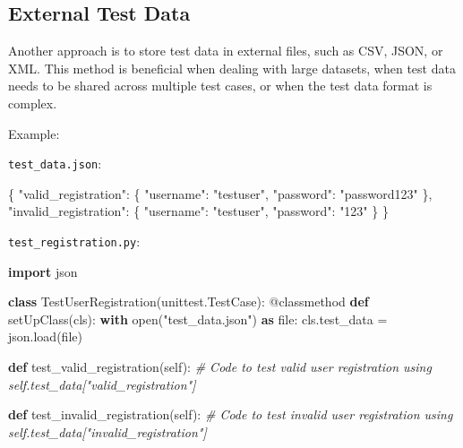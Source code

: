 \documentclass[
  paper=a4,
  ,captions=tableheading
]{scrartcl}
\newenvironment{Shaded}{}{}
\newcommand{\AttributeTok}[1]{\textcolor[rgb]{0.49,0.56,0.16}{#1}}
\newcommand{\BuiltInTok}[1]{\textcolor[rgb]{0.00,0.50,0.00}{#1}}
\newcommand{\CommentTok}[1]{\textcolor[rgb]{0.38,0.63,0.69}{\textit{#1}}}
\newcommand{\ControlFlowTok}[1]{\textcolor[rgb]{0.00,0.44,0.13}{\textbf{#1}}}
\newcommand{\DataTypeTok}[1]{\textcolor[rgb]{0.56,0.13,0.00}{#1}}
\newcommand{\FunctionTok}[1]{\textcolor[rgb]{0.02,0.16,0.49}{#1}}
\newcommand{\ImportTok}[1]{\textcolor[rgb]{0.00,0.50,0.00}{\textbf{#1}}}
\newcommand{\KeywordTok}[1]{\textcolor[rgb]{0.00,0.44,0.13}{\textbf{#1}}}
\newcommand{\NormalTok}[1]{#1}
\newcommand{\OperatorTok}[1]{\textcolor[rgb]{0.40,0.40,0.40}{#1}}
\newcommand{\StringTok}[1]{\textcolor[rgb]{0.25,0.44,0.63}{#1}}
\newcommand{\VariableTok}[1]{\textcolor[rgb]{0.10,0.09,0.49}{#1}}
\begin{document}
\hypertarget{external-test-data}{%
\subsection{External Test Data}\label{external-test-data}}

Another approach is to store test data in external files, such as CSV,
JSON, or XML. This method is beneficial when dealing with large
datasets, when test data needs to be shared across multiple test cases,
or when the test data format is complex.

Example:

\texttt{test\_data.json}:

\begin{Shaded}
\begin{Highlighting}[]
\FunctionTok{\{}
  \DataTypeTok{"valid\_registration"}\FunctionTok{:} \FunctionTok{\{}
    \DataTypeTok{"username"}\FunctionTok{:} \StringTok{"testuser"}\FunctionTok{,}
    \DataTypeTok{"password"}\FunctionTok{:} \StringTok{"password123"}
  \FunctionTok{\},}
  \DataTypeTok{"invalid\_registration"}\FunctionTok{:} \FunctionTok{\{}
    \DataTypeTok{"username"}\FunctionTok{:} \StringTok{"testuser"}\FunctionTok{,}
    \DataTypeTok{"password"}\FunctionTok{:} \StringTok{"123"}
  \FunctionTok{\}}
\FunctionTok{\}}
\end{Highlighting}
\end{Shaded}

\texttt{test\_registration.py}:

\begin{Shaded}
\begin{Highlighting}[]

\ImportTok{import}\NormalTok{ json}

\KeywordTok{class}\NormalTok{ TestUserRegistration(unittest.TestCase):}
    \AttributeTok{@classmethod}
    \KeywordTok{def}\NormalTok{ setUpClass(cls):}
        \ControlFlowTok{with} \BuiltInTok{open}\NormalTok{(}\StringTok{"test\_data.json"}\NormalTok{) }\ImportTok{as} \BuiltInTok{file}\NormalTok{:}
\NormalTok{            cls.test\_data }\OperatorTok{=}\NormalTok{ json.load(}\BuiltInTok{file}\NormalTok{)}

    \KeywordTok{def}\NormalTok{ test\_valid\_registration(}\VariableTok{self}\NormalTok{):}
        \CommentTok{\# Code to test valid user registration using self.test\_data["valid\_registration"]}

    \KeywordTok{def}\NormalTok{ test\_invalid\_registration(}\VariableTok{self}\NormalTok{):}
        \CommentTok{\# Code to test invalid user registration using self.test\_data["invalid\_registration"]}
\end{Highlighting}
\end{Shaded}
\end{document}
